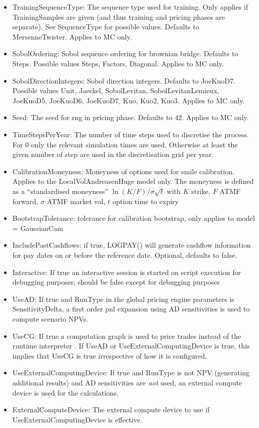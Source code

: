 \begin{itemize}
\item TrainingSequenceType: The sequence type used for training. Only applies if TrainingSamples are given (and thus
  training and pricing phases are separate). See SequenceType for possible values. Defaults to MersenneTwister. Applies
  to MC only.
\item SobolOrdering: Sobol sequence ordering for brownian bridge. Defaults to Steps. Possible values Steps, Factors,
  Diagonal. Applies to MC only.
\item SobolDirectionIntegers: Sobol direction integers. Defaults to JoeKuoD7. Possible values Unit, Jaeckel,
  SobolLevitan, SobolLevitanLemieux, JoeKuoD5, JoeKuoD6, JoeKuoD7, Kuo, Kuo2, Kuo3. Applies to MC only.
\item Seed: The seed for rng in pricing phase. Defaults to 42. Applies to MC only.
\item TimeStepsPerYear: The number of time steps used to discretise the process. For 0 only the relevant simulation
  times are used. Otherwise at least the given number of step are used in the discretisation grid per year.
\item CalibrationMoneyness: Moneyness of options used for smile calibration. Applies to the LocalVolAndreasenHuge model
  only. The moneyness is defined as a ``standardised moneyness'' $\ln(K/F) / \sigma\sqrt{t}$ with $K$ strike, $F$ ATMF
  forward, $\sigma$ ATMF market vol, $t$ option time to expiry
\item BootstrapTolerance: tolerance for calibration bootstrap, only applies to model = GaussianCam
\item IncludePastCashflows: if true, LOGPAY() will generate cashflow information for pay dates on or before the
  reference date. Optional, defaults to false.
\item Interactive: If true an interactive session is started on script execution for debugging purposes; should be false
  except for debugging purposes
\item UseAD: If true and RunType in the global pricing engine parameters is SensitivityDelta, a first order pnl
  expansion using AD sensitivities is used to compute scenario NPVs.
\item UseCG: If true a computation graph is used to price trades instead of the runtime interpreter . If UseAD or
  UseExternalComputingDevice is true, this implies that UseCG is true irrespective of how it is configured.
\item UseExternalComputingDevice: If true and RunType is not NPV (generating additional results) and AD sensitivities
  are {\em not} used, an external compute device is used for the calculations.
\item ExternalComputeDevice: The external compute device to use if UseExternalComputingDevice is effective.
\end{itemize}

